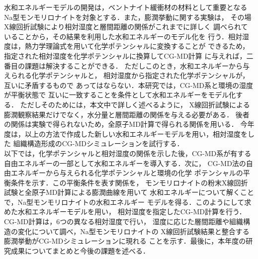 水和エネルギーモデルの開発は，ベントナイト緩衝材の材料として重要となる
Na型モンモリロナイトを対象とする．また，膨潤挙動に関する実験は，
その場X線回折試験により相対湿度と層間距離の関係がこれまでに詳しく
調べられていることから，その結果を利用した水和エネルギーのモデル化を
行う．相対湿度は，熱力学理論式を用いて化学ポテンシャルに変換することが
できるため，指定された相対湿度を化学ポテンシャルに換算してCG-MD計算
に与えれば，二番目の課題は解決することができる．
ただしこのとき，水和エネルギーから与えられる化学ポテンシャルと，
相対湿度から指定された化学ポテンシャルが，互いに矛盾するもので
あってはならない．本研究では，CG-MD系と環境の湿度が平衡状態で
互いに一致することを条件として水和エネルギーをモデル化する．
ただしそのためには，本文中で詳しく述べるように，
X線回折試験による膨潤観察結果だけでなく，水分量と層間距離の関係を与える必要がある．
後者の関係は実験で得られないため，全原子MD計算で得られる関係を用いる．
今年度は，以上の方法で作成した新しい水和エネルギーモデルを用い，相対湿度をした
組織構造形成のCG-MDシミュレーションを試行する．\\
\hspace{\parindent}
以下では，化学ポテンシャルと相対湿度の関係を示した後，CG-MD系が有する
自由エネルギーの一部として水和エネルギーを導入する．次に，
CG-MD法の自由エネルギーから与えられる化学ポテンシャルと環境の化学
ポテンシャルの平衡条件を示す．この平衡条件を表す関係を，
モンモリロナイトの粉末X線回折試験と全原子MD計算による膨潤曲線を用いて
水和エネルギーについて解くことで，Na型モンモリロナイトの水和エネルギー
モデルを得る．このようにして求めた水和エネルギーモデルを用い，
相対湿度を指定したCG-MD計算を行う．CG-MD計算は，6つの異なる相対湿度で行い，
湿度に応じた層間距離や組織構造の変化について調べ，Na型モンモリロナイトの
X線回折試験結果と整合する膨潤挙動がCG-MDシミュレーションに現れる
ことを示す．最後に，本年度の研究成果についてまとめと今後の課題を述べる．
